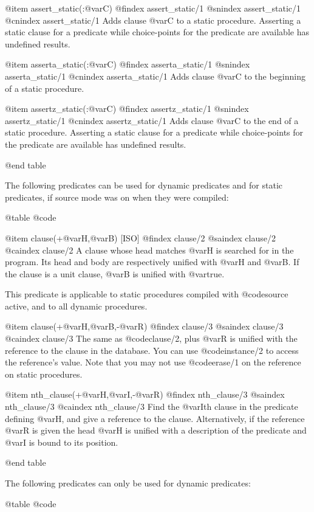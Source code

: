 {{{{{{@item assert_static(:@var{C})
@findex assert_static/1
@snindex assert_static/1
@cnindex assert_static/1
Adds clause @var{C} to a static procedure. Asserting a static clause
for a predicate while choice-points for the predicate are available has
undefined results.

@item asserta_static(:@var{C})
@findex asserta_static/1
@snindex asserta_static/1
@cnindex asserta_static/1
 Adds clause @var{C} to the beginning of a static procedure. 

@item assertz_static(:@var{C})
@findex assertz_static/1
@snindex assertz_static/1
@cnindex assertz_static/1
 Adds clause @var{C} to the end of a static procedure.  Asserting a
static clause for a predicate while choice-points for the predicate are
available has undefined results.

@end table

The following predicates can be used for dynamic predicates and for
static predicates, if source mode was on when they were compiled:

@table @code

@item clause(+@var{H},@var{B}) [ISO]
@findex clause/2
@saindex clause/2
@caindex clause/2
  A clause whose head matches @var{H} is searched for in the
program. Its head and body are respectively unified with @var{H} and
@var{B}. If the clause is a unit clause, @var{B} is unified with
@var{true}.

This predicate is applicable to static procedures compiled with
@code{source} active, and to all dynamic procedures.

@item clause(+@var{H},@var{B},-@var{R})
@findex clause/3
@saindex clause/3
@caindex clause/3
The same as @code{clause/2}, plus @var{R} is unified with the
reference to the clause in the database. You can use @code{instance/2}
to access the reference's value. Note that you may not use
@code{erase/1} on the reference on static procedures.

@item nth_clause(+@var{H},@var{I},-@var{R})
@findex nth_clause/3
@saindex nth_clause/3
@caindex nth_clause/3
Find the @var{I}th clause in the predicate defining @var{H}, and give
a reference to the clause. Alternatively, if the reference @var{R} is
given the head @var{H} is unified with a description of the predicate
and @var{I} is bound to its position.

@end table

The following predicates can only be used for dynamic predicates:

@table @code

}}}}}}
